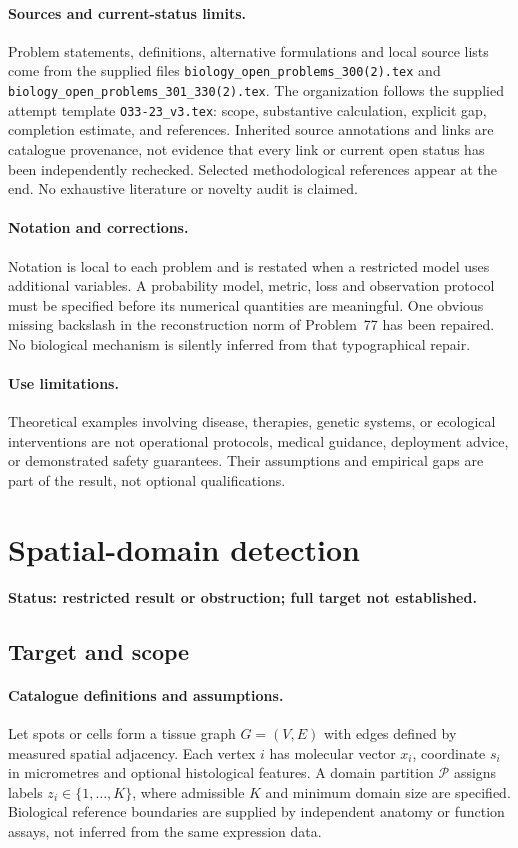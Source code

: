 \documentclass[11pt]{article}
\begin{document}
\paragraph{Sources and current-status limits.}
Problem statements, definitions, alternative formulations and local source lists
come from the supplied files
\texttt{biology\_open\_problems\_300(2).tex} and
\texttt{biology\_open\_problems\_301\_330(2).tex}.
The organization follows the supplied attempt template
\texttt{O33-23\_v3.tex}: scope, substantive calculation, explicit gap,
completion estimate, and references. Inherited source annotations and links are
catalogue provenance, not evidence that every link or current open status has
been independently rechecked. Selected methodological references appear at the
end. No exhaustive literature or novelty audit is claimed.

\paragraph{Notation and corrections.}
Notation is local to each problem and is restated when a restricted model uses
additional variables. A probability model, metric, loss and observation protocol
must be specified before its numerical quantities are meaningful. One obvious
missing backslash in the reconstruction norm of Problem~77 has been repaired.
No biological mechanism is silently inferred from that typographical repair.

\paragraph{Use limitations.}
Theoretical examples involving disease, therapies, genetic systems, or ecological
interventions are not operational protocols, medical guidance, deployment advice,
or demonstrated safety guarantees. Their assumptions and empirical gaps are part
of the result, not optional qualifications.


\section*{Spatial-domain detection}
\label{prob:074}
\noindent\textbf{Status: restricted result or obstruction; full target not established.}
\subsection{Target and scope}
\paragraph{Catalogue definitions and assumptions.}
Let spots or cells form a tissue graph $G=(V,E)$ with edges defined by measured spatial adjacency. Each vertex $i$ has molecular vector $x_i$, coordinate $s_i$ in micrometres and optional histological features. A domain partition $\mathcal P$ assigns labels $z_i\in\{1,\ldots,K\}$, where admissible $K$ and minimum domain size are specified. Biological reference boundaries are supplied by independent anatomy or function assays, not inferred from the same expression data.
\end{document}

